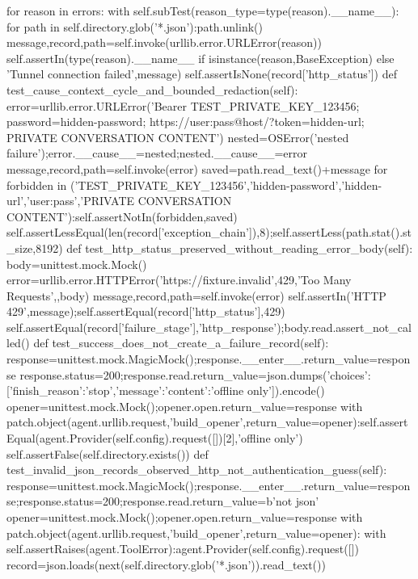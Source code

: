         for reason in errors:
            with self.subTest(reason_type=type(reason).__name__):
                for path in self.directory.glob('*.json'):path.unlink()
                message,record,path=self.invoke(urllib.error.URLError(reason))
                self.assertIn(type(reason).__name__ if isinstance(reason,BaseException) else 'Tunnel connection failed',message)
                self.assertIsNone(record['http_status'])
    def test_cause_context_cycle_and_bounded_redaction(self):
        error=urllib.error.URLError('Bearer TEST_PRIVATE_KEY_123456; password=hidden-password; https://user:pass@host/?token=hidden-url; PRIVATE CONVERSATION CONTENT')
        nested=OSError('nested failure');error.__cause__=nested;nested.__cause__=error
        message,record,path=self.invoke(error)
        saved=path.read_text()+message
        for forbidden in ('TEST_PRIVATE_KEY_123456','hidden-password','hidden-url','user:pass','PRIVATE CONVERSATION CONTENT'):self.assertNotIn(forbidden,saved)
        self.assertLessEqual(len(record['exception_chain']),8);self.assertLess(path.stat().st_size,8192)
    def test_http_status_preserved_without_reading_error_body(self):
        body=unittest.mock.Mock()
        error=urllib.error.HTTPError('https://fixture.invalid',429,'Too Many Requests',{},body)
        message,record,path=self.invoke(error)
        self.assertIn('HTTP 429',message);self.assertEqual(record['http_status'],429)
        self.assertEqual(record['failure_stage'],'http_response');body.read.assert_not_called()
    def test_success_does_not_create_a_failure_record(self):
        response=unittest.mock.MagicMock();response.__enter__.return_value=response
        response.status=200;response.read.return_value=json.dumps({'choices':[{'finish_reason':'stop','message':{'content':'offline only'}}]}).encode()
        opener=unittest.mock.Mock();opener.open.return_value=response
        with patch.object(agent.urllib.request,'build_opener',return_value=opener):self.assertEqual(agent.Provider(self.config).request([])[2],'offline only')
        self.assertFalse(self.directory.exists())
    def test_invalid_json_records_observed_http_not_authentication_guess(self):
        response=unittest.mock.MagicMock();response.__enter__.return_value=response;response.status=200;response.read.return_value=b'not json'
        opener=unittest.mock.Mock();opener.open.return_value=response
        with patch.object(agent.urllib.request,'build_opener',return_value=opener):
            with self.assertRaises(agent.ToolError):agent.Provider(self.config).request([])
        record=json.loads(next(self.directory.glob('*.json')).read_text())
